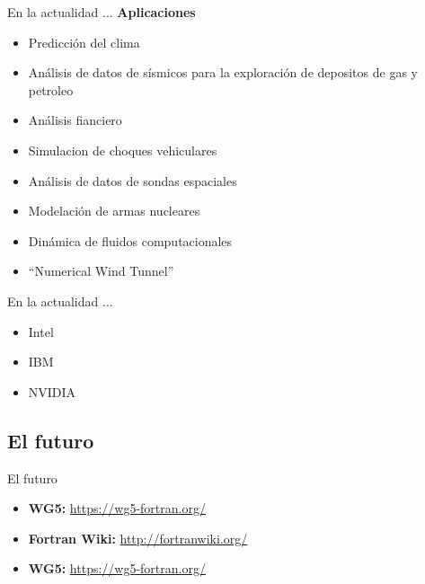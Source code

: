 \begin{frame}[fragile]{En la actualidad ...}
  \textbf{Aplicaciones}
  \begin{itemize}[<+(1)->]
    \item Predicción del clima
    \item Análisis de datos de sísmicos para la exploración de depositos de gas y petroleo
    \item Análisis fianciero
    \item Simulacion de choques vehiculares
    \item Análisis de datos de sondas espaciales
    \item Modelación de armas nucleares
    \item Dinámica de fluidos computacionales
    \item ``Numerical Wind Tunnel''
  \end{itemize}
\end{frame}


\begin{frame}[fragile]{En la actualidad ...}
  \begin{itemize}[<+(1)->]
    \item Intel
    \item IBM
    \item NVIDIA
  \end{itemize}
\end{frame}


\subsection{El futuro}
\begin{frame}[fragile]{El futuro}
  \begin{itemize}[<+(1)->]
    \item \textbf{WG5: }\url{https://wg5-fortran.org/}
    \item \textbf{Fortran Wiki: }\url{http://fortranwiki.org/}
    \item \textbf{WG5: }\url{https://wg5-fortran.org/}
  \end{itemize}
\end{frame}
